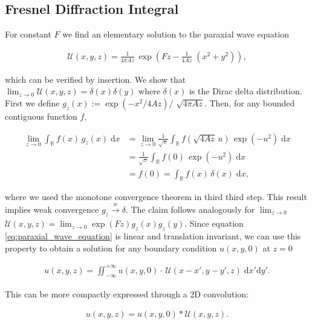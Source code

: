 
\subsection{Fresnel Diffraction Integral}

For constant $F$ we find an elementary solution to the paraxial wave equation

\begin{align*}
\mathcal{U}(x,y,z) = \frac{1}{4 \pi A z} \, \exp \! \left(F z-\frac{1}{4 A z} \; (x^2+y^2)\right),
\end{align*}

which can be verified by insertion. We show that $\lim_{z \rightarrow 0} \mathcal{U}(x,y,z) = \delta(x)\delta(y)$ where $\delta(x)$ is the Dirac delta distribution. First we define $g_z(x) := \exp(-x^2/4 A z) /$ $\sqrt{4 \pi A z}$. Then, for any bounded contiguous function $f$,

\begin{align*}
    \lim_{z \rightarrow 0} \int_\mathbb{R} f(x) \, g_z(x)  \; \text{d}x & = 
    \lim_{z \rightarrow 0} \frac{1}{\sqrt{\pi}} \int_\mathbb{R} f(\sqrt{4 A z} \, u) \, \exp(-u^2)  \; \text{d}x \\
    & =  \frac{1}{\sqrt{\pi}} \int_\mathbb{R} f(0) \, \exp(-u^2)  \; \text{d}x \\
    & = f(0) = \int_\mathbb{R} f(x) \, \delta(x)  \; \text{d}x,
\end{align*}

where we used the monotone convergence theorem in third third step. This result implies weak convergence $g_z \! \xrightarrow[]{w} \! \delta$. The claim follows analogously for $\lim_{z \rightarrow 0} $ $ \mathcal{U}(x,y,z) = \lim_{z \rightarrow 0} \exp(Fz) g_z(x) g_z(y)$. Since equation \eqref{eq:paraxial_wave_equation} is linear and translation invariant, we can use this property to obtain a solution for any boundary condition $u(x,y,0)$ at $z = 0$

\begin{align*}
u(x,y,z) = \iint_{-\infty}^{+\infty} u(x,y,0) \cdot \, \mathcal{U}(x-x',y-y', z) \; \mathrm d x' \mathrm d y'.
\end{align*}

This can be more compactly expressed through a 2D convolution:

\begin{align} \label{eq:fresnel_convolution}
u(x,y,z) =  u(x,y,0) * \mathcal{U}(x,y,z).
\end{align}
